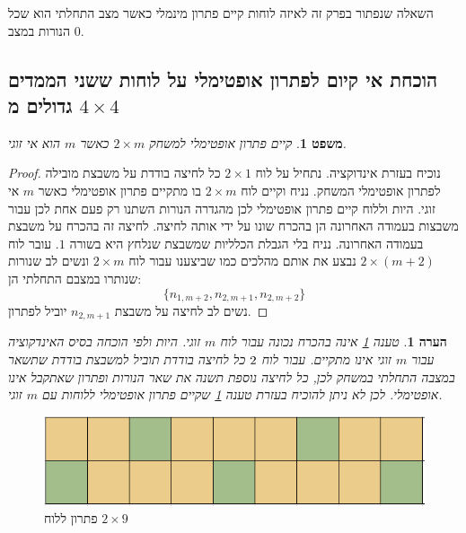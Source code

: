 \documentclass[12pt,leqno]{article}
\theoremstyle{theoremdd}
\newtheorem{theorem}{משפט}[section]
\newtheorem{comm}{הערה}[section]
\begin{document}
השאלה שנפתור בפרק זה לאיזה לוחות קיים פתרון מינמלי כאשר מצב התחלתי הוא שכל הנורות במצב
$0$.

\subsection{הוכחת אי קיום לפתרון אופטימלי על לוחות ששני הממדים גדולים מ
\texorpdfstring{$4 \times 4$}{4 x 4}}
\begin{theorem}
    \label{comm:sol to 2 x m}
    קיים פתרון אופטימלי למשחק 
    $2 \times m$
    כאשר 
    $m$
    הוא אי זוגי.
\end{theorem}
\begin{proof}
    נוכיח בעזרת אינדוקציה.
    נתחיל על לוח 
    $2 \times 1$
    כל לחיצה בודדת על משבצת מובילה לפתרון אופטימלי המשחק.
    נניח וקיים לוח 
    $2 \times m$
    בו מתקיים פתרון אופטימלי
    כאשר 
    $m$
    אי זוגי.
    היות וללוח קיים פתרון אופטימלי 
    לכן מהגדרה הנורות השתנו רק פעם אחת לכן 
    עבור משבצות בעמודה האחרונה 
    הן בהכרח שונו על ידי אותה לחיצה.
    לחיצה זה בהכרח על משבצת בעמודה האחרונה.
    נניח בלי הגבלת הכלליות שמשבצת שנלחץ היא בשורה 
    $1$.
    עובר לוח 
    $2 \times (m+2)$
    נבצע את אותם מהלכים כמו שביצענו עבור לוח 
    $2 \times m$
    ונשים לב 
    שנורות שנותרו במצבם התחלתי הן:
    \[ \{n_{1,m+2}, n_{2,m+1}, n_{2,m+2}\} \]
    נשים לב לחיצה על 
    משבצת 
    $n_{2,m+1}$
    יוביל לפתרון.
\end{proof}
\begin{comm}
    טענה 
    \ref{comm:sol to 2 x m}
    אינה בהכרח נכונה עבור לוח 
    $m$
    זוגי.
    היות ולפי הוכחה בסיס האינדקוציה עבור 
    $m$
    זוגי אינו מתקיים.
    עבור לוח 
    $2 \time 2$
    כל לחיצה בודדת תוביל למשבצת בודדת שתשאר במצבה התחלתי במשחק
    לכן, כל לחיצה נוספת תשנה את שאר הנורות ופתרון שאתקבל אינו אופטימלי.
    לכן לא ניתן להוכיח בעזרת טענה 
    \ref{comm:sol to 2 x m}
    שקיים פתרון אופטימלי ללוחות עם 
    $m$
    זוגי.
\end{comm}

\begin{figure}[ht]
    \caption{פתרון ללוח 
    $2 \times 9$}
    \label{fig: 2x9 have min sol}
    \centering
    \includegraphics[width=.5\textwidth,keepaspectratio]{images/2xm_sol.PNG}
\end{figure}
\end{document}
